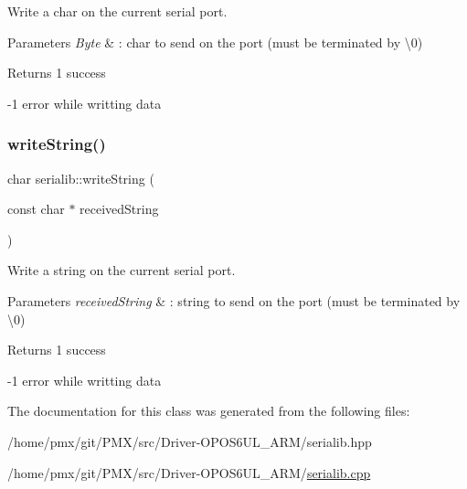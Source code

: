 Write a char on the current serial port. 


\begin{DoxyParams}{Parameters}
{\em Byte} & \+: char to send on the port (must be terminated by \textquotesingle{}\textbackslash{}0\textquotesingle{}) \\
\hline
\end{DoxyParams}
\begin{DoxyReturn}{Returns}
1 success 

-\/1 error while writting data 
\end{DoxyReturn}
\mbox{\label{classserialib_a6a32655c718b998e5b63d8cdc483ac6d}} 
\subsubsection{\texorpdfstring{write\+String()}{writeString()}}
{\footnotesize\ttfamily char serialib\+::write\+String (\begin{DoxyParamCaption}\item[{const char $\ast$}]{received\+String }\end{DoxyParamCaption})}



Write a string on the current serial port. 


\begin{DoxyParams}{Parameters}
{\em received\+String} & \+: string to send on the port (must be terminated by \textquotesingle{}\textbackslash{}0\textquotesingle{}) \\
\hline
\end{DoxyParams}
\begin{DoxyReturn}{Returns}
1 success 

-\/1 error while writting data 
\end{DoxyReturn}


The documentation for this class was generated from the following files\+:\begin{DoxyCompactItemize}
\item 
/home/pmx/git/\+P\+M\+X/src/\+Driver-\/\+O\+P\+O\+S6\+U\+L\+\_\+\+A\+R\+M/serialib.\+hpp\item 
/home/pmx/git/\+P\+M\+X/src/\+Driver-\/\+O\+P\+O\+S6\+U\+L\+\_\+\+A\+R\+M/\hyperlink{serialib_8cpp}{serialib.\+cpp}\end{DoxyCompactItemize}

